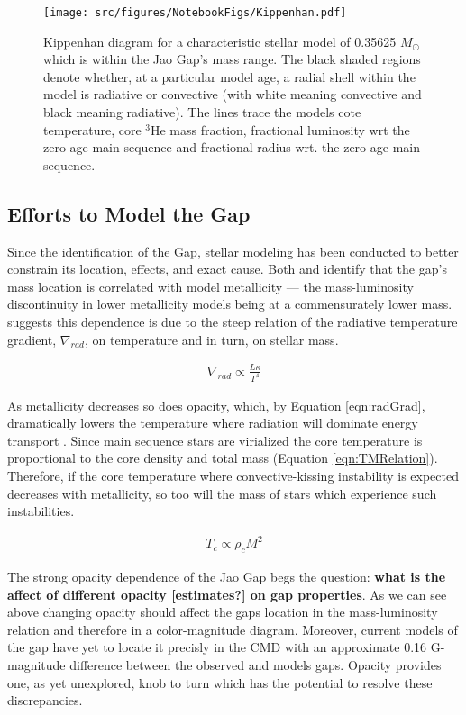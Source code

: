 \begin{figure*}
	\centering
	\texttt{[image: src/figures/NotebookFigs/Kippenhan.pdf]}
	\caption{Kippenhan diagram for a characteristic stellar model of 0.35625
	$M_{\odot}$ which is within the Jao Gap's mass range. The black shaded
	regions denote whether, at a particular model age, a radial shell within
	the model is radiative or convective (with white meaning convective and
	black meaning radiative). The lines trace the models cote temperature, core
	$^{3}$He mass fraction, fractional luminosity wrt the zero age main
	sequence and fractional radius wrt. the zero age main sequence.}
	\label{fig:Kippenhan1}
\end{figure*}


\subsection{Efforts to Model the Gap}
Since the identification of the Gap, stellar modeling has been
conducted to better constrain its location, effects, and exact cause.
Both \citet{Mansfield2021} and \citet{Feiden2021} identify that the gap's mass
location is correlated with model metallicity --- the mass-luminosity
discontinuity in lower metallicity models being at a commensurately lower mass.
\citet{Feiden2021} suggests this dependence is due to the steep relation of
the radiative temperature gradient, $\nabla_{rad}$, on temperature and in turn,
on stellar mass.

\begin{align}\label{eqn:radGrad}
	\nabla_{rad} \propto \frac{L\kappa}{T^{4}}
\end{align}

As metallicity decreases so does opacity, which, by Equation \ref{eqn:radGrad},
dramatically lowers the temperature where radiation will dominate energy transport
\citep{Chabrier1997}. Since main sequence stars are virialized the core
temperature is proportional to the core density and total mass (Equation
\ref{eqn:TMRelation}). Therefore, if the core temperature where
convective-kissing instability is expected decreases with metallicity, so too
will the mass of stars which experience such instabilities.

\begin{align}\label{eqn:TMRelation}
	T_{c} \propto \rho_{c}M^{2}
\end{align}

The strong opacity dependence of the Jao Gap begs the question: \textbf{what is
the affect of different opacity {\color{red} [estimates?]} on gap properties}.
As we can see above changing opacity should affect the gaps location in the
mass-luminosity relation and therefore in a color-magnitude diagram. Moreover,
current models of the gap have yet to locate it precisly in the CMD
\citep{Feiden2021} with an approximate 0.16 G-magnitude difference between the
observed and models gaps. Opacity provides one, as yet unexplored, knob to turn
which has the potential to resolve these discrepancies.
